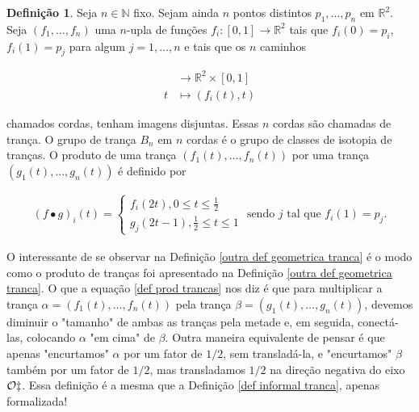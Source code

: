 \documentclass[a4paper,portuguese,11pt,twoside, leqno]{book}
\theoremstyle{definition}
\newtheorem{deff}{Definição}[section]
\begin{document}
	\begin{deff}
		\label{outra def geometrica tranca}
		Seja $n\in\mathbb{N}$ fixo. Sejam ainda $n$ pontos distintos $p_1, \dots, p_n$ em $\mathbb{R}^2$. Seja $(f_1, \dots, f_n)$ uma $n$-upla de funções $f_i:[0,1]\to\mathbb{R}^2$ tais que $f_i(0) = p_i$, $f_i(1) = p_j$ para algum $j=1,\dots,n$ e tais que os $n$ caminhos 
		
		\begin{align*}
		[0,1]&\to\mathbb{R}^2\times[0,1] \\
		t&\mapsto (f_i(t), t)
		\end{align*}
		
		\par\vspace{0.3cm} chamados cordas, tenham imagens disjuntas. Essas $n$ cordas são chamadas de trança. O grupo de trança $B_n$ em $n$ cordas é o grupo de classes de isotopia de tranças. O produto de uma trança $( f_1(t), \dots, f_n(t) )$ por uma trança $( g_1(t), \dots, g_n(t) )$ é definido por
		
		\begin{align}
		\label{def prod trancas}
		(f\bullet g)_i(t) = \begin{cases}
		f_i(2t), 0\leq t\leq \displaystyle{\frac{1}{2}} \\
		g_j(2t-1), \displaystyle{\frac{1}{2}}\leq t\leq 1
		\end{cases}\text{ sendo } j \text{ tal que }f_i(1) = p_j.
		\end{align}
		
	\end{deff}
	
	\par\vspace{0.3cm} O interessante de se observar na Definição \eqref{outra def geometrica tranca} é o modo como o produto de tranças foi apresentado na Definição \eqref{outra def geometrica tranca}. O que a equação \eqref{def prod trancas} nos diz é que para multiplicar a trança $\alpha = ( f_1(t), \dots, f_n(t) )$ pela trança $\beta = ( g_1(t), \dots, g_n(t) )$, devemos diminuir o "tamanho" de ambas as tranças pela metade e, em seguida, conectá-las, colocando $\alpha$ "em cima" de $\beta$. Outra maneira equivalente de pensar é que apenas "encurtamos" $\alpha$ por um fator de $1/2$, sem transladá-la, e "encurtamos" $\beta$ também por um fator de $1/2$, mas transladamos $1/2$ na direção negativa do eixo $\cal{O}z$. Essa definição é a mesma que a Definição \eqref{def informal tranca}, apenas formalizada!
	
\end{document}
